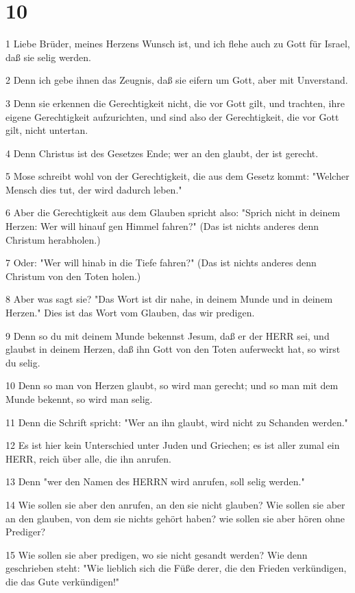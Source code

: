 \chapter{10}

\par 1 Liebe Brüder, meines Herzens Wunsch ist, und ich flehe auch zu Gott für Israel, daß sie selig werden.
\par 2 Denn ich gebe ihnen das Zeugnis, daß sie eifern um Gott, aber mit Unverstand.
\par 3 Denn sie erkennen die Gerechtigkeit nicht, die vor Gott gilt, und trachten, ihre eigene Gerechtigkeit aufzurichten, und sind also der Gerechtigkeit, die vor Gott gilt, nicht untertan.
\par 4 Denn Christus ist des Gesetzes Ende; wer an den glaubt, der ist gerecht.
\par 5 Mose schreibt wohl von der Gerechtigkeit, die aus dem Gesetz kommt: "Welcher Mensch dies tut, der wird dadurch leben."
\par 6 Aber die Gerechtigkeit aus dem Glauben spricht also: "Sprich nicht in deinem Herzen: Wer will hinauf gen Himmel fahren?" (Das ist nichts anderes denn Christum herabholen.)
\par 7 Oder: "Wer will hinab in die Tiefe fahren?" (Das ist nichts anderes denn Christum von den Toten holen.)
\par 8 Aber was sagt sie? "Das Wort ist dir nahe, in deinem Munde und in deinem Herzen." Dies ist das Wort vom Glauben, das wir predigen.
\par 9 Denn so du mit deinem Munde bekennst Jesum, daß er der HERR sei, und glaubst in deinem Herzen, daß ihn Gott von den Toten auferweckt hat, so wirst du selig.
\par 10 Denn so man von Herzen glaubt, so wird man gerecht; und so man mit dem Munde bekennt, so wird man selig.
\par 11 Denn die Schrift spricht: "Wer an ihn glaubt, wird nicht zu Schanden werden."
\par 12 Es ist hier kein Unterschied unter Juden und Griechen; es ist aller zumal ein HERR, reich über alle, die ihn anrufen.
\par 13 Denn "wer den Namen des HERRN wird anrufen, soll selig werden."
\par 14 Wie sollen sie aber den anrufen, an den sie nicht glauben? Wie sollen sie aber an den glauben, von dem sie nichts gehört haben? wie sollen sie aber hören ohne Prediger?
\par 15 Wie sollen sie aber predigen, wo sie nicht gesandt werden? Wie denn geschrieben steht: "Wie lieblich sich die Füße derer, die den Frieden verkündigen, die das Gute verkündigen!"
